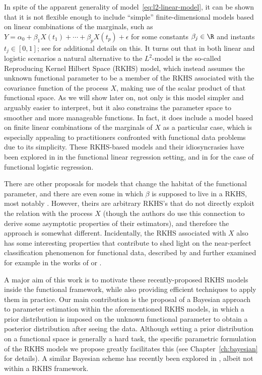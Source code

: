 In spite of the apparent generality of model~\eqref{eq:l2-linear-model}, it can be shown that it is not flexible enough to include ``simple'' finite-dimensional models based on linear combinations of the marginals, such as \(Y=\alpha_0 + \beta_1 X(t_1)+ \cdots + \beta_p X(t_p) + \epsilon\) for some constants \(\beta_j\in\R\) and instants \(t_j\in[0,1]\); see \citet{berrendero2020general} for additional details on this. It turns out that in both linear and logistic scenarios a natural alternative to the \(L^2\)-model is the so-called Reproducing Kernel Hilbert Space (RKHS) model, which instead assumes the unknown functional parameter to be a member of the RKHS associated with the covariance function of the process \(X\), making use of the scalar product of that functional space. As we will show later on, not only is this model simpler and arguably easier to interpret, but it also constrains the parameter space to smoother and more manageable functions. In fact, it does include a model based on finite linear combinations of the marginals of \(X\) as a particular case, which is especially appealing to practitioners confronted with functional data problems due to its simplicity. These RKHS-based models and their idiosyncrasies have been explored in \citet{berrendero2019rkhs, berrendero2020general} in the functional linear regression setting, and in \citet{berrendero2018functional} for the case of functional logistic regression.

There are other proposals for models that change the habitat of the functional parameter, and there are even some in which \(\beta\) is supposed to live in a RKHS, most notably \citet{yuan2010reproducing}. However, theirs are arbitrary RKHS's that do not directly exploit the relation with the process \(X\) (though the authors do use this connection to derive some asymptotic properties of their estimators), and therefore the approach is somewhat different. Incidentally, the RKHS associated with \(X\) also has some interesting properties that contribute to shed light on the near-perfect classification phenomenon for functional data, described by \citet{delaigle2012achieving} and further examined for example in the works of \citet{berrendero2018use} or \citet{torrecilla2020optimal}.

A major aim of this work is to motivate these recently-proposed RKHS models inside the functional framework, while also providing efficient techniques to apply them in practice. Our main contribution is the proposal of a Bayesian approach to parameter estimation within the aforementioned RKHS models, in which a prior distribution is imposed on the unknown functional parameter to obtain a posterior distribution after seeing the data. Although setting a prior distribution on a functional space is generally a hard task, the specific parametric formulation of the RKHS models we propose greatly facilitates this (see Chapter~\ref{ch:bayesian} for details). A similar Bayesian scheme has recently been explored in \citet{grollemund2019bayesian}, albeit not within a RKHS framework.

